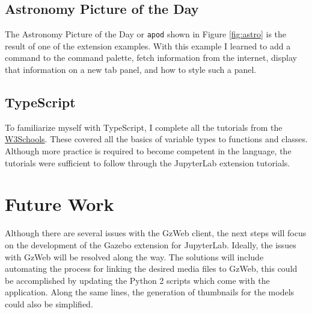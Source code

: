     \subsection{Astronomy Picture of the Day}
    
    The Astronomy Picture of the Day or \texttt{apod} shown in Figure \ref{fig:astro} is the result of one of the extension examples. With this example I learned to add a command to the command palette, fetch information from the internet, display that information on a new tab panel, and how to style such a panel.
    
    \subsection{TypeScript}
    
    To familiarize myself with TypeScript, I complete all the tutorials from the \href{https://www.w3schools.com/typescript/index.php}{W3Schools}. These covered all the basics of variable types to functions and classes. Although more practice is required to become competent in the language, the tutorials were sufficient to follow through the JupyterLab extension tutorials. 
    
\section{Future Work}

    Although there are several issues with the GzWeb client, the next steps will focus on the development of the Gazebo extension for JupyterLab. Ideally, the issues with GzWeb will be resolved along the way. The solutions will include automating the process for linking the desired media files to GzWeb, this could be accomplished by updating the Python 2 scripts which come with the application. Along the same lines, the generation of thumbnails for the models could also be simplified.
